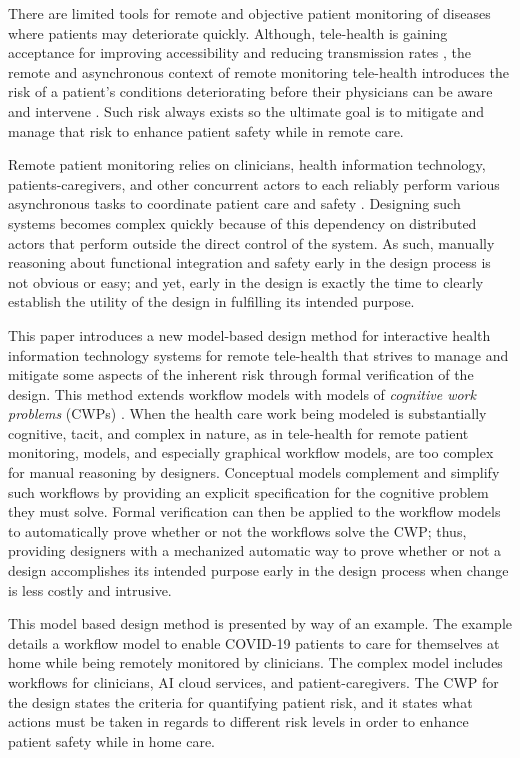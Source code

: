 There are limited tools for remote and objective patient monitoring of diseases where patients may deteriorate quickly. Although, tele-health is gaining acceptance for improving accessibility and reducing transmission rates \cite{10.1093/jamia/ocaa048,telehealth,10.1093/jamia/ocaa067}, the remote and asynchronous context of remote monitoring tele-health introduces the risk of a patient's conditions deteriorating before their physicians can be aware and intervene \cite{10.1097/ALN.0000000000003578}. Such risk always exists so the ultimate goal is to mitigate and manage that risk to enhance patient safety while in remote care. 

Remote patient monitoring relies on clinicians, health information technology, patients-caregivers, and other concurrent actors to each reliably perform various asynchronous tasks to coordinate patient care and safety \cite{remote,Aalam229}. Designing such systems becomes complex quickly because of this dependency on distributed actors that perform outside the direct control of the system. As such, manually reasoning about functional integration and safety early in the design process is not obvious or easy; and yet, early in the design is exactly the time to clearly establish the utility of the design in fulfilling its intended purpose. 

This paper introduces a new model-based design method for interactive health information technology systems for remote tele-health that strives to manage and mitigate some aspects of the inherent risk through formal verification of the design. This method extends workflow models with models of \emph{cognitive work problems} (CWPs) \cite{workflowmodel,workcentered,BERRY201615,chi2010}. When the health care work being modeled is substantially cognitive, tacit, and complex in nature, as in tele-health for remote patient monitoring, models, and especially graphical workflow models, are too complex for manual reasoning by designers. Conceptual models complement and simplify such workflows by providing an explicit specification for the cognitive problem they must solve. Formal verification can then be applied to the workflow models to automatically prove whether or not the workflows solve the CWP; thus, providing designers with a mechanized automatic way to prove whether or not a design accomplishes its intended purpose early in the design process when change is less costly and intrusive.

This model based design method is presented by way of an example. The example details a workflow model to enable COVID-19 patients to care for themselves at home while being remotely monitored by clinicians. The complex model includes workflows for clinicians, AI cloud services, and patient-caregivers. The CWP for the design states the criteria for quantifying patient risk, and it states what actions must be taken in regards to different risk levels in order to enhance patient safety while in home care. 

